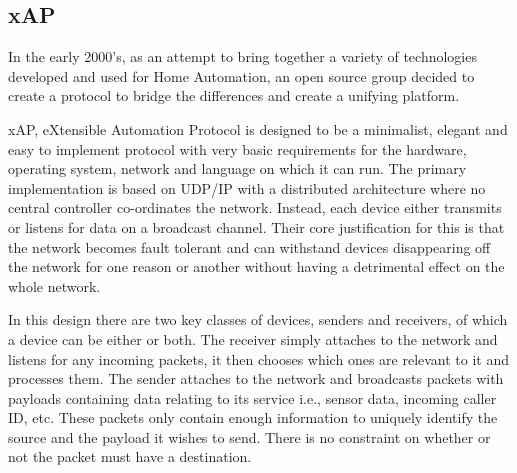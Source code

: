 \newpage


\subsection{xAP} %
\label{sub:xap}

In the early 2000's, as an attempt to bring together a variety of technologies developed and used for Home Automation, an open source group decided to create a protocol to bridge the differences and create a unifying platform.\cite{xAP}

xAP, eXtensible Automation Protocol is designed to be a minimalist, elegant and easy to implement protocol with very basic requirements for the hardware, operating system, network and language on which it can run.  
The primary implementation is based on UDP/IP with a distributed architecture where no central controller co-ordinates the network. Instead, each device either transmits or listens for data on a broadcast channel. Their core justification for this is that the network becomes fault tolerant and can withstand devices disappearing off the network for one reason or another without having a detrimental effect on the whole network.

In this design there are two key classes of devices, senders and receivers, of which a device can be either or both. 
The receiver simply attaches to the network and listens for any incoming packets, it then chooses which ones are relevant to it and processes them.
The sender attaches to the network and broadcasts packets with payloads containing data relating to its service i.e., sensor data, incoming caller ID, etc. These packets only contain enough information to uniquely identify the source and the payload it wishes to send. There is no constraint on whether or not the packet must have a destination.

